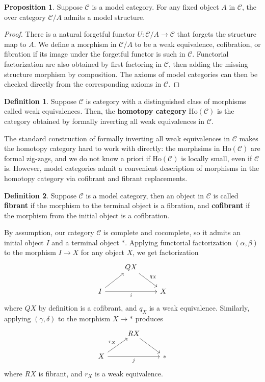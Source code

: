 \documentclass{article}
\theoremstyle{definition}
\theoremstyle{definition}
\newtheorem{definition}{Definition}[theorem]
\theoremstyle{definition}
\theoremstyle{definition}
\newtheorem{proposition}{Proposition}[theorem]
\theoremstyle{definition}
\theoremstyle{definition}
\theoremstyle{definition}
\begin{document}
\begin{proposition}
	Suppose $\mathcal{C}$ is a model category. For any fixed object $A$ in $\mathcal{C}$, the over category $\mathcal{C}/A$ admits a model structure. 
\end{proposition}
\begin{proof}
	There is a natural forgetful functor $U: \mathcal{C}/A\to \mathcal{C}$ that forgets the structure map to $A$. We define a morphism in $\mathcal{C}/A$ to be a weak equivalence, cofibration, or fibration if its image under the forgetful functor is such in $\mathcal{C}$. Functorial factorization are also obtained by first factoring in $\mathcal{C}$, then adding the missing structure morphism by composition. The axioms of model categories can then be checked directly from the corresponding axioms in $\mathcal{C}$.
\end{proof}

\begin{definition}
	Suppose $\mathcal{C}$ is category with a distinguished class of morphisms called weak equivalences. Then, the \textbf{homotopy category} $\textrm{Ho}(\mathcal{C})$ is the category obtained by formally inverting all weak equivalences in $\mathcal{C}$.
\end{definition}


The standard construction of formally inverting all weak equivalences in $\mathcal{C}$ makes the homotopy category hard to work with directly: the morphsims in $\textrm{Ho}(\mathcal{C})$ are formal zig-zags, and we do not know a priori if $\textrm{Ho}(\mathcal{C})$ is locally small, even if $\mathcal{C}$ is. However, model categories admit a convenient description of morphisms in the homotopy category via cofibrant and fibrant replacements.
\begin{definition}
	Suppose $\mathcal{C}$ is a model category, then an object in $\mathcal{C}$ is called \textbf{fibrant} if the morphism to the terminal object is a fibration, and \textbf{cofibrant} if the morphism from the initial object is a cofibration.
\end{definition}
By assumption, our category $\mathcal{C}$ is complete and cocomplete, so it admits an initial object $I$ and a terminal object $*$. Applying functorial factorization $(\alpha,\beta)$ to the morphism $I\to X$ for any object $X$, we get factorization 
\[\begin{tikzcd}
	& {QX} \\
	I & {} & X
	\arrow["q_X", from=1-2, to=2-3]
	\arrow[from=2-1, to=1-2]
	\arrow["i"', from=2-1, to=2-3]
\end{tikzcd}\]
where $QX$ by definition is a cofibrant, and $q_X$ is a weak equivalence. Similarly, applying $(\gamma,\delta)$ to the morphism $X\to *$ produces 
\[\begin{tikzcd}
	& {RX} \\
	X & {} & *
	\arrow[from=1-2, to=2-3]
	\arrow["r_X", from=2-1, to=1-2]
	\arrow["j"', from=2-1, to=2-3]
\end{tikzcd}\]
where $RX$ is fibrant, and $r_X$ is a weak equivalence. 
\end{document}
